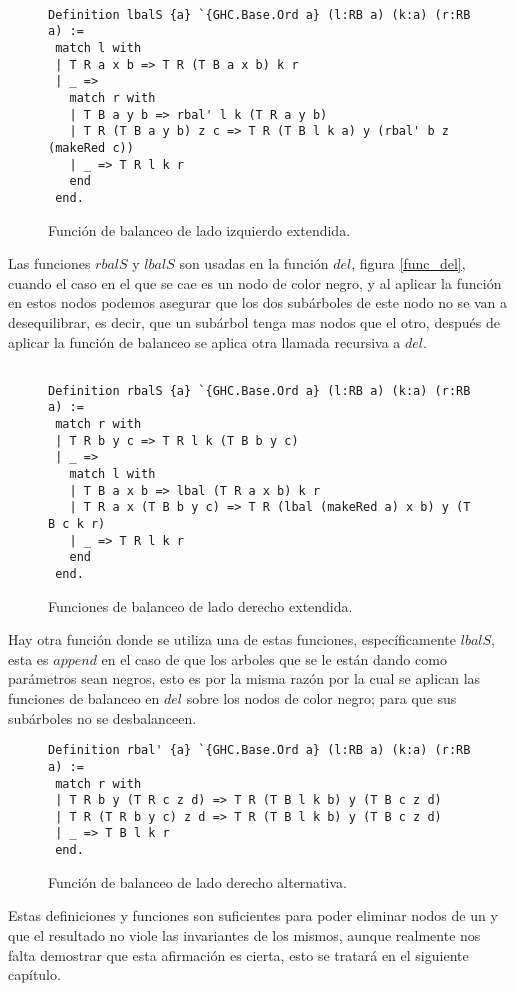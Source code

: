 \begin{figure}
\centering
\captionsetup{justification=centering}
\begin{verbatim}

Definition lbalS {a} `{GHC.Base.Ord a} (l:RB a) (k:a) (r:RB a) :=
 match l with
 | T R a x b => T R (T B a x b) k r
 | _ =>
   match r with
   | T B a y b => rbal' l k (T R a y b)
   | T R (T B a y b) z c => T R (T B l k a) y (rbal' b z (makeRed c))
   | _ => T R l k r
   end
 end.

\end{verbatim}
\caption{Funci\'on de balanceo de lado izquierdo extendida.}
\label{lbalS}
\end{figure}

Las funciones $rbalS$ y $lbalS$ son usadas en la funci\'on $del$, figura \ref{func_del}, cuando el
caso en el que se cae es un nodo de color negro, y al aplicar la funci\'on en estos nodos podemos
asegurar que los dos subárboles de este nodo no se van a desequilibrar, es decir, que un subárbol
tenga mas nodos que el otro, después de aplicar la función de balanceo se aplica otra llamada
recursiva a $del$.


\begin{figure}
\centering
\captionsetup{justification=centering}
\begin{verbatim}

Definition rbalS {a} `{GHC.Base.Ord a} (l:RB a) (k:a) (r:RB a) :=
 match r with
 | T R b y c => T R l k (T B b y c)
 | _ =>
   match l with
   | T B a x b => lbal (T R a x b) k r
   | T R a x (T B b y c) => T R (lbal (makeRed a) x b) y (T B c k r)
   | _ => T R l k r
   end
 end.

\end{verbatim}
\caption{Funciones de balanceo de lado derecho extendida.}
\label{rbalS}
\end{figure}

Hay otra función donde se utiliza una de estas funciones, específicamente $lbalS$, esta es $append$
en el caso de que los arboles que se le están dando como parámetros sean negros, esto es por la
misma razón por la cual se aplican las funciones de balanceo en $del$ sobre los nodos de color
negro; para que sus subárboles no se desbalanceen.

\begin{figure}
\centering
\captionsetup{justification=centering}
\begin{verbatim}
Definition rbal' {a} `{GHC.Base.Ord a} (l:RB a) (k:a) (r:RB a) :=
 match r with
 | T R b y (T R c z d) => T R (T B l k b) y (T B c z d)
 | T R (T R b y c) z d => T R (T B l k b) y (T B c z d)
 | _ => T B l k r
 end.

\end{verbatim}
\caption{Funci\'on de balanceo de lado derecho alternativa.}
\label{rbal_2}
\end{figure}

Estas definiciones y funciones son suficientes para poder eliminar nodos de un {\arn} y que el
resultado no viole las invariantes de los mismos, aunque realmente nos falta demostrar que esta
afirmaci\'on es cierta, esto se tratar\'a en el siguiente cap\'itulo.
